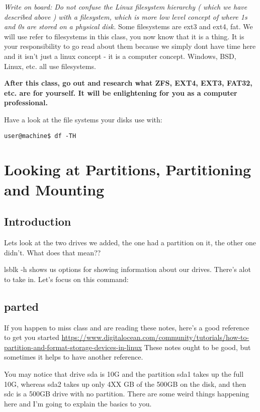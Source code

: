\documentclass[10pt]{article}
\begin{document}
{\LARGE\textit{Write on board: Do not confuse the Linux filesystem hierarchy ( which we have described above ) with a filesystem, which is more low level concept of where 1s and 0s are stored on a physical disk.} Some filesystems are ext3 and ext4, fat. We will use refer to filesystems in this class, you now know that it is a thing. It is your responsibility to go read about them because we simply dont have time here and it isn't just a linux concept - it is a computer concept. Windows, BSD, Linux, etc. all use filesystems.}

\begin{center}
\textbf{After this class, go out and research what ZFS, EXT4, EXT3, FAT32, etc. are for yourself. It will be enlightening for you as a computer professional.}
\end{center}

Have a look at the file systems your disks use with:

\begin{lstlisting}
user@machine$ df -TH 
\end{lstlisting}


\section{Looking at Partitions, Partitioning and Mounting}

\subsection{Introduction}

Lets look at the two drives we added, the one had a partition on it, the other one didn't. What does that mean??

lsblk -h shows us options for showing information about our drives. There's alot to take in. Let's focus on this command:


\subsection{parted}

If you happen to miss class and are reading these notes, here's a good reference to get you started
\url{https://www.digitalocean.com/community/tutorials/how-to-partition-and-format-storage-devices-in-linux}
These notes ought to be good, but sometimes it helps to have another reference.

You may notice that drive sda is 10G and the partition sda1 takes up the full 10G, whereas sda2 takes up only 4XX GB of the 500GB on the disk, and then sdc is a 500GB drive with no partition. There are some weird things happening here and I'm going to explain the basics to you.
\end{document}
